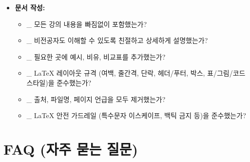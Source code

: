 \documentclass[11pt,a4paper]{article}
\theoremstyle{definition}
\begin{document}
\begin{itemize}
\begin{itemize}
        \item \_ \texttt{_rescued_data} 컬럼을 활용하여 잘못된 데이터를 식별하고 복구하는 방법을 이해하는가?
        \item \_ 스트리밍 작업을 시작하고 중지하는 방법을 아는가?
    \end{itemize}
    \item \textbf{문서 작성:}
    \begin{itemize}
        \item \_ 모든 강의 내용을 빠짐없이 포함했는가?
        \item \_ 비전공자도 이해할 수 있도록 친절하고 상세하게 설명했는가?
        \item \_ 필요한 곳에 예시, 비유, 비교표를 추가했는가?
        \item \_ LaTeX 레이아웃 규격 (여백, 줄간격, 단락, 헤더/푸터, 박스, 표/그림/코드 스타일)을 준수했는가?
        \item \_ 출처, 파일명, 페이지 언급을 모두 제거했는가?
        \item \_ LaTeX 안전 가드레일 (특수문자 이스케이프, 백틱 금지 등)을 준수했는가?
    \end{itemize}
\end{itemize}

\newpage
\section{FAQ (자주 묻는 질문)}
\end{document}
